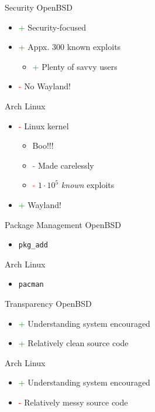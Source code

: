 \documentclass{beamer}
\newcommand{\good}{\textcolor{green}{+ }}
\newcommand{\bad}{\textcolor{red}{- }}
\begin{document}
			\begin{frame}{Security}
				OpenBSD
				\begin{itemize}
					\item \good Security-focused
					\item \good Appx. 300 known exploits
					\begin{itemize}
						\item \good Plenty of savvy users
					\end{itemize}
					\item \bad No Wayland!
				\end{itemize}
				Arch Linux
				\begin{itemize}
					\item \bad Linux kernel
					\begin{itemize}
						\item Boo!!!
						\item \bad Made carelessly
						\item \bad $1\cdot10^5$ \textit{known} exploits
					\end{itemize}
					\item \good Wayland!
				\end{itemize}
			\end{frame}
			\begin{frame}{Package Management}
				OpenBSD
				\begin{itemize}
					\item \texttt{pkg\_add}
				\end{itemize}
				Arch Linux
				\begin{itemize}
					\item \texttt{pacman}
				\end{itemize}
			\end{frame}
			\begin{frame}{Transparency}
				OpenBSD
				\begin{itemize}
					\item \good Understanding system encouraged
					\item \good Relatively clean source code
				\end{itemize}
				Arch Linux
				\begin{itemize}
					\item \good Understanding system encouraged
					\item \bad Relatively messy source code
				\end{itemize}
			\end{frame}
\end{document}

